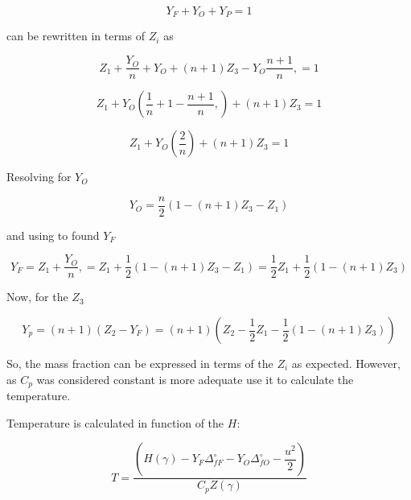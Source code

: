 \begin{equation}
   Y_F+Y_O+Y_P=1 
\end{equation}

can be rewritten in terms of $Z_i$ as 

\begin{equation}
   Z_1
   +
   \frac{Y_O}{n} 
   +
   Y_O
   +
   (n+1)Z_3
   -
   Y_O\frac{n+1}{n}, 
   =
   1 
\end{equation}

\begin{equation}
   Z_1
   +
   Y_O
   \left(
   \frac{1}{n} 
   +
   1
   -
   \frac{n+1}{n}, 
   \right)
   +
   (n+1)Z_3
   =
   1 
\end{equation}

\begin{equation}
   Z_1
   +
   Y_O
   \left(
   \frac{2}{n} 
   \right)
   +
   (n+1)Z_3
   =
   1 
\end{equation}

Resolving for $Y_O$

\begin{equation}
   Y_O
   =
   \frac{n}{2} 
   \left(
   1 
   -
   (n+1)Z_3
   -
   Z_1
   \right)
\end{equation}

and using to found $Y_F$ 

\begin{equation}
   Y_F
   =
   Z_1
   +
   \frac{Y_O}{n}, 
   =
   Z_1
   +
   \frac{1}{2} 
   \left(
   1 
   -
   (n+1)Z_3
   -
   Z_1
   \right)
   =
   \frac{1}{2} 
   Z_1
   +
   \frac{1}{2} 
   \left(
   1
   -
   (n+1)Z_3
   \right)
\end{equation}

Now, for the $Z_3$

\begin{equation}
   Y_p 
   =
   (n+1)
   \left(
       Z_2
       -
       Y_F
   \right)
   =
   (n+1)
   \left(
       Z_2
       -
   \frac{1}{2} 
   Z_1
   -
   \frac{1}{2} 
   \left(
   1
   -
   (n+1)Z_3
   \right)
   \right)
\end{equation}

So, the mass fraction can be expressed in terms of the $Z_i$ as expected.  However, as $C_p$ was considered constant is more adequate use it to 
calculate the temperature.

Temperature is calculated in function of the $H$:

\begin{equation}
T
=
\frac{\left(    
    H(\gamma)
    -
    Y_F
    \Delta^{\circ}_{fF}
    -
    Y_O
    \Delta^{\circ}_{fO}
    -
    \dfrac{u^2}{2}
\right)}
{C_pZ(\gamma)}
\end{equation}

